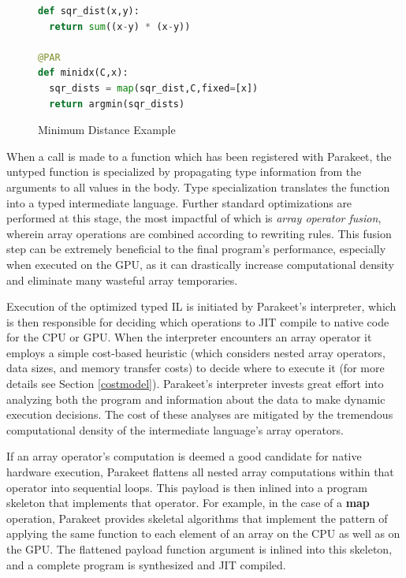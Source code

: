 \documentclass[10pt,twocolumn]{article}
\begin{document}
\begin{figure}[h!]
\begin{lstlisting}[numbers=none,language=Python,frame=single]
def sqr_dist(x,y):
  return sum((x-y) * (x-y))

@PAR
def minidx(C,x):
  sqr_dists = map(sqr_dist,C,fixed=[x])
  return argmin(sqr_dists)
\end{lstlisting}
\caption{Minimum Distance Example}
\label{MinIdx}
\end{figure}

When a call is made to a function which has been registered with Parakeet, the untyped function is specialized by propagating type information from the arguments to all values in the body.  Type specialization translates the function into a typed intermediate language. Further standard optimizations are performed at this stage, the most impactful of which is \emph{array operator fusion}, wherein array operations are combined according to rewriting rules. This fusion step can be extremely beneficial to the final program's performance, especially when executed on the GPU, as it can drastically increase computational density and eliminate many wasteful array temporaries.

Execution of the optimized typed IL is initiated by Parakeet's interpreter, which is then responsible for deciding which operations to JIT compile to native code for the CPU or GPU. When the interpreter encounters an array operator it employs a simple cost-based heuristic (which considers nested array operators, data sizes, and memory transfer costs) to decide where to execute it (for more details see Section \ref{costmodel}). Parakeet's interpreter invests great effort into analyzing both the program and information about the data to make dynamic execution decisions. The cost of these analyses are mitigated by the tremendous computational density of the intermediate language's array operators.

If an array operator's computation is deemed a good candidate for native hardware execution, Parakeet flattens all nested array computations within that operator into sequential loops.  This payload is then inlined into a program skeleton that implements that operator.  For example, in the case of a \textbf{map} operation, Parakeet provides skeletal algorithms that implement the pattern of applying the same function to each element of an array on the CPU as well as on the GPU.  The flattened payload function argument is inlined into this skeleton, and a complete program is synthesized and JIT compiled.
\end{document}

